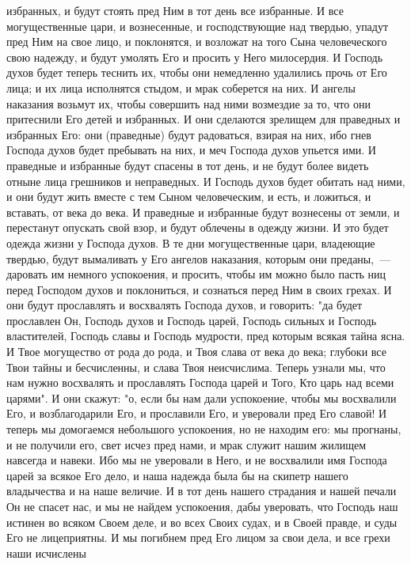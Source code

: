 избранных, и будут стоять пред Ним в тот день все избранные.
И все могущественные цари, и вознесенные, и господствующие над
твердью, упадут пред Ним на свое лицо, и поклонятся, и возложат на того Сына
человеческого свою надежду, и будут умолять Его и просить у Него милосердия.
И Господь духов будет теперь теснить их, чтобы они немедленно
удалились прочь от Его лица; и их лица исполнятся стыдом, и мрак соберется на
них.
И ангелы наказания возьмут их, чтобы совершить над ними возмездие за
то, что они притеснили Его детей и избранных.
И они сделаются зрелищем для праведных и избранных Его: они
(праведные) будут радоваться, взирая на них, ибо гнев Господа духов будет
пребывать на них, и меч Господа духов упьется ими.
И праведные и избранные будут спасены в тот день, и не будут более
видеть отныне лица грешников и неправедных.
И Господь духов будет обитать над ними, и они будут жить вместе с тем
Сыном человеческим, и есть, и ложиться, и вставать, от века до века.
И праведные и избранные будут вознесены от земли, и перестанут
опускать свой взор, и будут облечены в одежду жизни.
И это будет одежда жизни у Господа духов.
В те дни могущественные цари, владеющие твердью, будут вымаливать
у Его ангелов наказания, которым они преданы,~--- даровать им немного успокоения,
и просить, чтобы им можно было пасть ниц перед Господом духов и поклониться, и
сознаться перед Ним в своих грехах.
И они будут прославлять и восхвалять Господа духов, и говорить: "да
будет прославлен Он, Господь духов и Господь царей, Господь сильных и Господь
властителей, Господь славы и Господь мудрости, пред которым всякая тайна ясна.
И Твое могущество от рода до рода, и Твоя слава от века до века;
глубоки все Твои тайны и бесчисленны, и слава Твоя неисчислима.
Теперь узнали мы, что нам нужно восхвалять и прославлять Господа царей
и Того, Кто царь над всеми царями".
И они скажут: "о, если бы нам дали успокоение, чтобы мы восхвалили
Его, и возблагодарили Его, и прославили Его, и уверовали пред Его славой!
И теперь мы домогаемся небольшого успокоения, но не находим его: мы
прогнаны, и не получили его, свет исчез пред нами, и мрак служит нашим жилищем
навсегда и навеки.
Ибо мы не уверовали в Него, и не восхвалили имя Господа царей за
всякое Его дело, и наша надежда была бы на скипетр нашего владычества и на наше
величие.
И в тот день нашего страдания и нашей печали Он не спасет нас, и мы не
найдем успокоения, дабы уверовать, что Господь наш истинен во всяком Своем
деле, и во всех Своих судах, и в Своей правде, и суды Его не лицеприятны.
И мы погибнем пред Его лицом за свои дела, и все грехи наши исчислены
